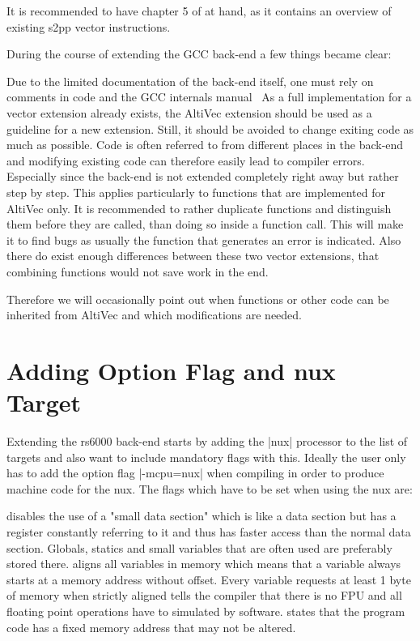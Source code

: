 It is recommended to have chapter 5 of \citep{nux} at hand, as it contains an overview of existing s2pp vector instructions.

During the course of extending the GCC back-end a few things became clear:

Due to the limited documentation of the back-end itself, one must rely on comments in code and the GCC internals manual~\citep{GCCint} 
As a full implementation for a vector extension already exists, the AltiVec extension should be used as a guideline for a new extension. 
Still, it should be avoided to change exiting code as much as possible.
Code is often referred to from different places in the back-end and modifying existing code can therefore easily lead to compiler errors.
Especially since the back-end is not extended completely right away but rather step by step.
This applies particularly to functions that are implemented for AltiVec only.
It is recommended to rather duplicate functions and distinguish them before they are called, than doing so inside a function call.
This will make it to find bugs as usually the function that generates an error is indicated.
Also there do exist enough differences between these two vector extensions, that combining functions would not save work in the end.

Therefore we will occasionally point out when functions or other code can be inherited from AltiVec and which modifications are needed.

\section{Adding Option Flag and nux Target}
Extending the rs6000 back-end starts by adding the |nux| processor to the list of targets and also want to include mandatory flags with this.
Ideally the user only has to add the option flag |-mcpu=nux| when compiling in order to produce machine code for the nux.
The flags which have to be set when using the nux are:
\begin{description}
        disables the use of a "small data section" which is like a data section but has a register constantly referring to it and thus has faster access than the normal data section. Globals, statics and small variables that are often used are preferably stored there.
        aligns all variables in memory which means that a variable always starts at a memory address without offset. Every variable requests at least 1 byte of memory when strictly aligned
        tells the compiler that there is no FPU and all floating point operations have to simulated by software.
        states that the program code has a fixed memory address that may not be altered.
\end{description}

